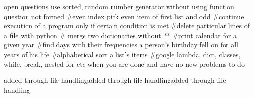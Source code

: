open questions
use sorted, random number generator without using function
question not formed #even index pick even item of first list and odd 
#continue execution of a program only if certain condition is met
#delete particular lines of a file with python
# merge two dictionaries without **
#print calendar for a given year #find days with their frequencies a person's birthday fell on for all years of his life
#alphabetical sort a list's items
#google lambda, dict, classes, while, break, nested for etc  when you are done and have no new problems to do


added through file handlingadded through file handlingadded through file handling
